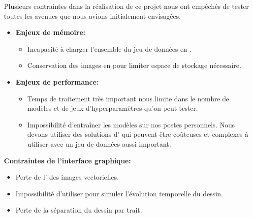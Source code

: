 Plusieurs contraintes dans la réalisation de ce projet nous ont empêchés de tester toutes les avenues que nous avions initialement envisagées.
\begin{itemize}
  \item \textbf{Enjeux de mémoire:}
	  \begin{itemize}
	      \item Incapacité à charger l'ensemble du jeu de données en .
	      \item Conservation des images en  pour limiter espace de stockage nécessaire.
	  \end{itemize}
  \item \textbf{Enjeux de performance:}
	  \begin{itemize}
		\item Temps de traitement très important nous limite dans le nombre de modèles et de jeux d'hyperparamètres qu'on peut tester.
		\item Impossibilité d'entraîner les modèles sur nos postes personnels. Nous devons utiliser des solutions d' qui peuvent être coûteuses et complexes à utiliser avec un jeu de données aussi important.
	\end{itemize}
\end{itemize}

\textbf{Contraintes de l'interface graphique:}
\begin{itemize}
    \item Perte de l' des images vectorielles.
    \item Impossibilité d'utiliser  pour simuler l'évolution temporelle du dessin.
	\item Perte de la séparation du dessin par trait.
\end{itemize}

\vspace{-.25mm}